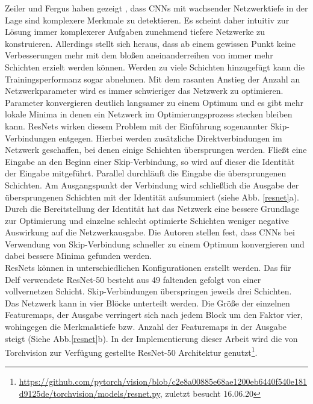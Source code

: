 Zeiler und Fergus haben gezeigt \cite{extraction_point_meaning}, dass CNNs mit wachsender Netzwerktiefe in der Lage sind komplexere Merkmale zu detektieren. Es scheint daher intuitiv zur Lösung immer komplexerer Aufgaben zunehmend tiefere Netzwerke zu konstruieren. Allerdings stellt sich heraus, dass ab einem gewissen Punkt keine Verbesserungen mehr mit dem bloßen aneinanderreihen von immer mehr Schichten erzielt werden können. Werden zu viele Schichten hinzugefügt kann die Trainingsperformanz sogar abnehmen. Mit dem rasanten Anstieg der Anzahl an Netzwerkparameter wird es immer schwieriger das Netzwerk zu optimieren. Parameter konvergieren deutlich langsamer zu einem Optimum und es gibt mehr lokale Minima in denen ein Netzwerk im Optimierungsprozess stecken bleiben kann. ResNets wirken diesem Problem mit der Einführung sogenannter Skip-Verbindungen entgegen. Hierbei werden zusätzliche Direktverbindungen im Netzwerk geschaffen, bei denen einige Schichten übersprungen werden. Fließt eine Eingabe an den Beginn einer Skip-Verbindung, so wird auf dieser die Identität der Eingabe mitgeführt. Parallel durchläuft die Eingabe die übersprungenen Schichten. Am Ausgangspunkt der Verbindung wird schließlich die Ausgabe der übersprungenen Schichten mit der Identität aufsummiert (siehe Abb. \ref{resnet}a). Durch die Bereitstellung der Identität hat das Netzwerk eine bessere Grundlage zur Optimierung und einzelne schlecht optimierte Schichten weniger negative Auswirkung auf die Netzwerkausgabe. Die Autoren stellen fest, dass CNNs bei Verwendung von Skip-Verbindung schneller zu einem Optimum konvergieren und dabei bessere Minima gefunden werden. 
\\
ResNets können in unterschiedlichen Konfigurationen erstellt werden. Das für Delf verwendete \mbox{ResNet-50} besteht aus 49 faltenden gefolgt von einer vollvernetzen Schicht. Skip-Verbindungen überspringen jeweils drei Schichten. Das Netzwerk kann in vier Blöcke unterteilt werden. Die Größe der einzelnen Featuremaps, der Ausgabe verringert sich nach jedem Block um den Faktor vier, wohingegen die Merkmalstiefe bzw. Anzahl der Featuremaps in der Ausgabe steigt (Siehe Abb.\ref{resnet}b). In der Implementierung dieser Arbeit wird die von Torchvision zur Verfügung gestellte ResNet-50 Architektur genutzt\footnote[1]{\url{https://github.com/pytorch/vision/blob/c2e8a00885e68ae1200eb6440f540e181d9125de/torchvision/models/resnet.py}, zuletzt besucht 16.06.20}. 
